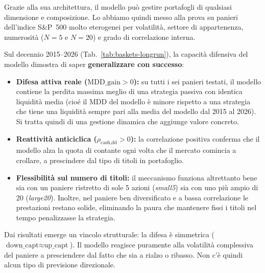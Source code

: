 Grazie alla sua architettura, il modello può gestire portafogli di qualsiasi dimensione e composizione. Lo abbiamo quindi messo alla prova su panieri dell'indice S\&P~500 molto eterogenei per volatilità, settore di appartenenza, numerosità ($N=5$ e $N=20$) e grado di correlazione interna.

Sul decennio 2015--2026 (Tab.~\ref{tab:baskets-longrun}), la capacità difensiva del modello dimostra di saper \textbf{generalizzare con successo}:
\begin{itemize}
    \item \textbf{Difesa attiva reale ($\mathrm{MDD\_gain} > 0$):} su tutti i sei panieri testati, il modello contiene la perdita massima meglio di una strategia passiva con identica liquidità media (cioé il MDD del modello è minore rispetto a una strategia che tiene una liquidità sempre pari alla media del modello dal 2015 al 2026). Si tratta quindi di una gestione dinamica che aggiunge valore concreto.
    \item \textbf{Reattività anticiclica ($\rho_{\text{cash,dd}} > 0$):} la correlazione positiva conferma che il modello alza la quota di contante ogni volta che il mercato comincia a crollare, a prescindere dal tipo di titoli in portafoglio.
    \item \textbf{Flessibilità sul numero di titoli:} il meccanismo funziona altrettanto bene sia con un paniere ristretto di sole 5 azioni (\emph{small5}) sia con uno più ampio di 20 (\emph{large20}). Inoltre, nel paniere ben diversificato e a bassa correlazione le prestazioni restano solide, eliminando la paura che mantenere fissi i titoli nel tempo penalizzasse la strategia.
\end{itemize}

Dai risultati emerge un vincolo strutturale: la difesa è simmetrica ($\text{down\_capt} \approx \text{up\_capt}$).
Il modello reagisce puramente alla volatilità complessiva del paniere a presciendere dal fatto che sia a rialzo o ribasso.
Non c'è quindi alcun tipo di previsione direzionale.

